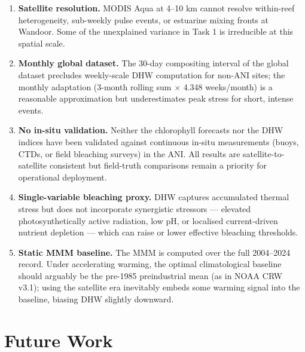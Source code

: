 \documentclass[12pt,a4paper]{report}
\begin{document}
\begin{enumerate}[leftmargin=*]
  \item \textbf{Satellite resolution.} MODIS Aqua at 4--10 km cannot resolve
  within-reef heterogeneity, sub-weekly pulse events, or estuarine mixing fronts at
  Wandoor. Some of the unexplained variance in Task 1 is irreducible at this
  spatial scale.

  \item \textbf{Monthly global dataset.} The 30-day compositing interval of the global
  dataset precludes weekly-scale DHW computation for non-ANI sites; the monthly
  adaptation (3-month rolling sum $\times$ 4.348 weeks/month) is a reasonable
  approximation but underestimates peak stress for short, intense events.

  \item \textbf{No in-situ validation.} Neither the chlorophyll forecasts nor the
  DHW indices have been validated against continuous in-situ measurements
  (buoys, CTDs, or field bleaching surveys) in the ANI. All results are
  satellite-to-satellite consistent but field-truth comparisons remain a priority
  for operational deployment.

  \item \textbf{Single-variable bleaching proxy.} DHW captures accumulated thermal
  stress but does not incorporate synergistic stressors — elevated photosynthetically
  active radiation, low pH, or localised current-driven nutrient depletion — which
  can raise or lower effective bleaching thresholds.

  \item \textbf{Static MMM baseline.} The MMM is computed over the full 2004--2024
  record. Under accelerating warming, the optimal climatological baseline should
  arguably be the pre-1985 preindustrial mean (as in NOAA CRW v3.1); using the
  satellite era inevitably embeds some warming signal into the baseline, biasing
  DHW slightly downward.
\end{enumerate}

\section{Future Work}
\end{document}
